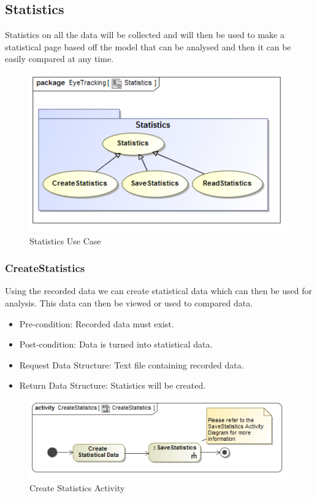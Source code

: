 \subsection{Statistics}
Statistics on all the data will be collected and will then be used to make a statistical page based off the model that can be analysed and then it can be easily compared at any time.
\newline
\begin{figure}[!ht]
	\centering
	\includegraphics[scale=0.5,width=15cm,keepaspectratio]{Diagrams/Use_Case_Diagram__Statistics.png}
	\caption{Statistics Use Case}
	\end{figure}
	
		\subsubsection{CreateStatistics}
Using the recorded data we can create statistical data which can then be used for analysis. This data can then be viewed or used to compared data.
\begin{itemize}
\item Pre-condition: Recorded data must exist.
\item Post-condition: Data is turned into statistical data.
\item Request Data Structure: Text file containing recorded data.
\item Return Data Structure: Statistics will be created.
\end{itemize}

\begin{figure}[!ht]
	\centering
	\includegraphics[scale=0.5,width=15cm,keepaspectratio]{Diagrams/Activity_Diagram__CreateStatistics__CreateStatistics.png}
	\caption{Create Statistics Activity}
	\end{figure}
	
